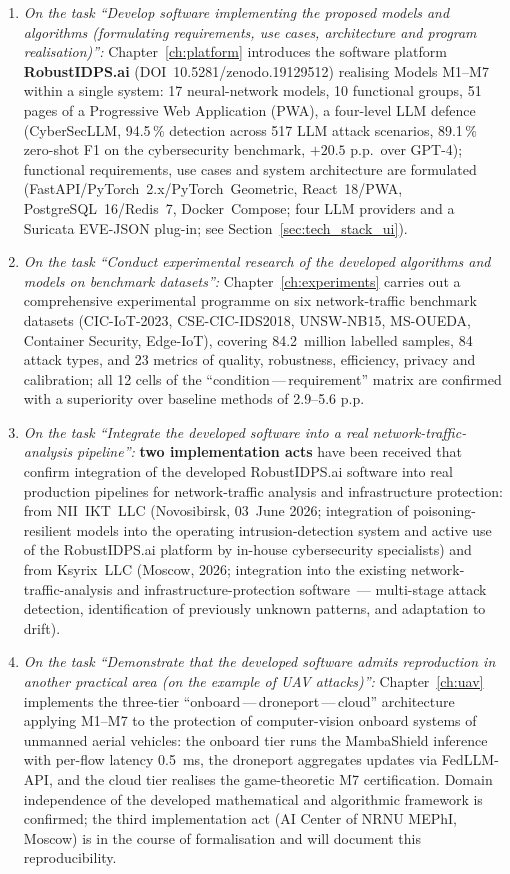 \begin{enumerate}[leftmargin=2em, itemsep=0.3em]
\item \textit{On the task ``Develop software implementing the
proposed models and algorithms (formulating requirements, use
cases, architecture and program realisation)'':}
Chapter~\ref{ch:platform} introduces the software platform
\textbf{RobustIDPS.ai} (DOI~10.5281/zenodo.19129512) realising
Models M1--M7 within a single system: 17 neural-network models,
10 functional groups, 51 pages of a Progressive Web Application
(PWA), a four-level LLM defence (CyberSecLLM, 94.5\,\% detection
across 517 LLM attack scenarios, 89.1\,\% zero-shot F1 on the
cybersecurity benchmark, $+20.5$ p.p.\ over GPT-4); functional
requirements, use cases and system architecture are formulated
(FastAPI/PyTorch~2.x/PyTorch~Geometric, React~18/PWA,
PostgreSQL~16/Redis~7, Docker~Compose; four LLM providers and a
Suricata EVE-JSON plug-in; see Section~\ref{sec:tech_stack_ui}).

\item \textit{On the task ``Conduct experimental research of the
developed algorithms and models on benchmark datasets'':}
Chapter~\ref{ch:experiments} carries out a comprehensive
experimental programme on six network-traffic benchmark datasets
(CIC-IoT-2023, CSE-CIC-IDS2018, UNSW-NB15, MS-OUEDA, Container
Security, Edge-IoT), covering 84.2~million labelled samples,
84 attack types, and 23 metrics of quality, robustness,
efficiency, privacy and calibration; all 12 cells of the
``condition\,---\,requirement'' matrix are confirmed with a
superiority over baseline methods of 2.9--5.6 p.p.

\item \textit{On the task ``Integrate the developed software into
a real network-traffic-analysis pipeline'':} \textbf{two
implementation acts} have been received that confirm integration
of the developed RobustIDPS.ai software into real production
pipelines for network-traffic analysis and infrastructure
protection: from NII~IKT~LLC (Novosibirsk, 03~June 2026;
integration of poisoning-resilient models into the operating
intrusion-detection system and active use of the RobustIDPS.ai
platform by in-house cybersecurity specialists) and from
Ksyrix~LLC (Moscow, 2026; integration into the existing
network-traffic-analysis and infrastructure-protection software~---
multi-stage attack detection, identification of previously unknown
patterns, and adaptation to drift).

\item \textit{On the task ``Demonstrate that the developed
software admits reproduction in another practical area (on the
example of UAV attacks)'':} Chapter~\ref{ch:uav} implements the
three-tier ``onboard\,---\,droneport\,---\,cloud'' architecture
applying M1--M7 to the protection of computer-vision onboard
systems of unmanned aerial vehicles: the onboard tier runs the
MambaShield inference with per-flow latency 0.5~ms, the droneport
aggregates updates via FedLLM-API, and the cloud tier realises
the game-theoretic M7 certification. Domain independence of the
developed mathematical and algorithmic framework is confirmed;
the third implementation act (AI Center of NRNU MEPhI, Moscow) is
in the course of formalisation and will document this
reproducibility.


\end{enumerate}

